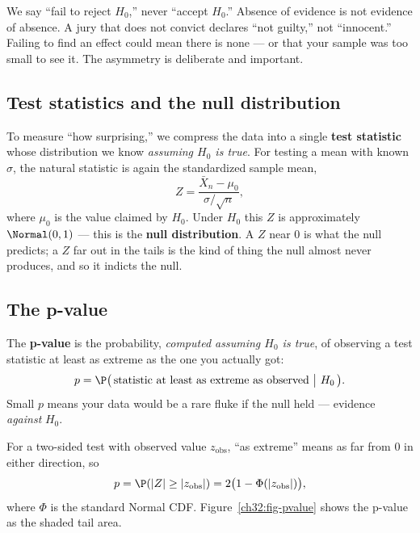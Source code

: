 \begin{trapbox}
We say ``fail to reject $H_0$,'' never ``accept $H_0$.'' Absence of evidence is not
evidence of absence. A jury that does not convict declares ``not guilty,'' not
``innocent.'' Failing to find an effect could mean there is none --- or that your sample
was too small to see it. The asymmetry is deliberate and important.
\end{trapbox}

\subsection{Test statistics and the null distribution}

To measure ``how surprising,'' we compress the data into a single \textbf{test
statistic} whose distribution we know \emph{assuming $H_0$ is true}. For testing a mean
with known $\sigma$, the natural statistic is again the standardized sample mean,
\[
  Z = \frac{\bar X_n - \mu_0}{\sigma/\sqrt n},
\]
where $\mu_0$ is the value claimed by $H_0$. Under $H_0$ this $Z$ is approximately
$\Normal(0,1)$ --- this is the \textbf{null distribution}. A $Z$ near $0$ is what the
null predicts; a $Z$ far out in the tails is the kind of thing the null almost never
produces, and so it indicts the null.

\subsection{The p-value}

\begin{formalbox}
The \textbf{p-value} is the probability, \emph{computed assuming $H_0$ is true}, of
observing a test statistic at least as extreme as the one you actually got:
\[
  p = \P\big(\,\text{statistic at least as extreme as observed}\ \big|\ H_0\,\big).
\]
Small $p$ means your data would be a rare fluke if the null held --- evidence
\emph{against} $H_0$.
\end{formalbox}

For a two-sided test with observed value $z_{\text{obs}}$, ``as extreme'' means as far
from $0$ in either direction, so
\[
  p = \P(|Z| \ge |z_{\text{obs}}|) = 2\big(1 - \Phi(|z_{\text{obs}}|)\big),
\]
where $\Phi$ is the standard Normal CDF. Figure~\ref{ch32:fig-pvalue} shows the p-value
as the shaded tail area.

